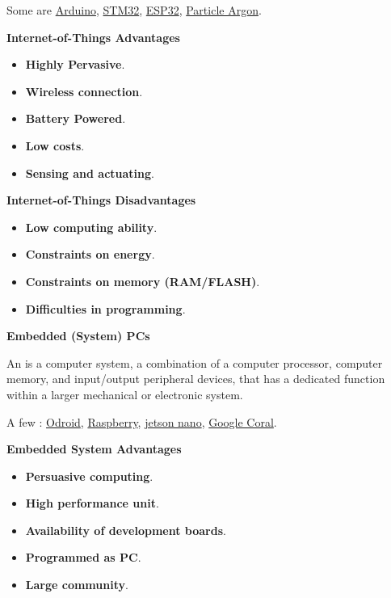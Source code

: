 \highspace
Some  are \href{https://www.arduino.cc/}{Arduino}, \href{https://www.st.com/en/microcontrollers-microprocessors/stm32-32-bit-arm-cortex-mcus.html}{STM32}, \href{https://en.wikipedia.org/wiki/ESP32}{ESP32}, \href{https://docs.particle.io/argon/}{Particle Argon}.

\begin{flushleft}
    \textcolor{Green3}{ \textbf{Internet-of-Things Advantages}}
\end{flushleft}
\begin{itemize}
    \item \textbf{Highly Pervasive}.
    \item \textbf{Wireless connection}.
    \item \textbf{Battery Powered}.
    \item \textbf{Low costs}.
    \item \textbf{Sensing and actuating}.
\end{itemize}

\begin{flushleft}
    \textcolor{Red2}{ \textbf{Internet-of-Things Disadvantages}}
\end{flushleft}
\begin{itemize}
    \item \textbf{Low computing ability}.
    \item \textbf{Constraints on energy}.
    \item \textbf{Constraints on memory (RAM/FLASH)}.
    \item \textbf{Difficulties in programming}.
\end{itemize}

\longline

\begin{center}
    \large
    \textcolor{Red3}{\textbf{Embedded (System) PCs}}
\end{center}

\noindent
An  is a computer system, a combination of a computer processor, computer memory, and input/output peripheral devices, that has a dedicated function within a larger mechanical or electronic system.

\highspace
A few : \href{https://www.hardkernel.com/}{Odroid}, \href{https://www.raspberrypi.com/}{Raspberry}, \href{https://developer.nvidia.com/embedded/jetson-nano}{jetson nano}, \href{https://www.coral.ai/}{Google Coral}.

\begin{flushleft}
    \textcolor{Green3}{ \textbf{Embedded System Advantages}}
\end{flushleft}
\begin{itemize}
    \item \textbf{Persuasive computing}.
    \item \textbf{High performance unit}.
    \item \textbf{Availability of development boards}.
    \item \textbf{Programmed as PC}.
    \item \textbf{Large community}.
\end{itemize}

